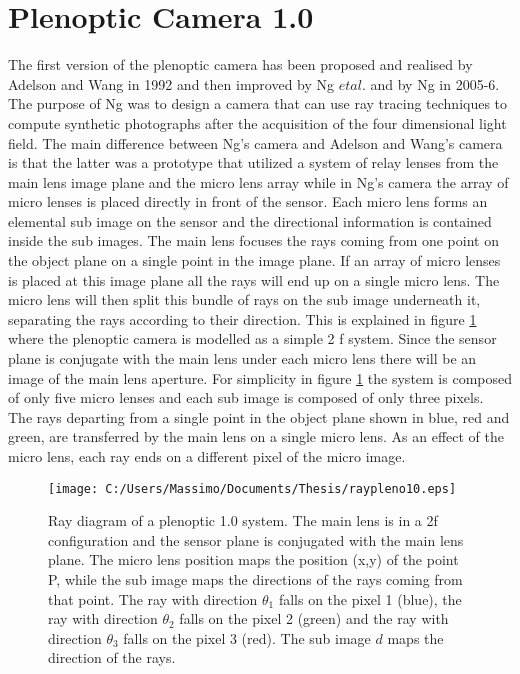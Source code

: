 \section{Plenoptic Camera 1.0}
\label{sec:camera10}
The first version of the plenoptic camera has been proposed and realised by Adelson and Wang in 1992 \cite{adelson1992single} and then improved by Ng $et al.$ \cite{ng2005light} and by Ng \cite{ng2006digital}in 2005-6.\\ The purpose of Ng was to design a camera that can use ray tracing techniques to compute synthetic photographs after the acquisition of the four dimensional light field. The main difference between Ng's camera and Adelson and Wang's camera is that the latter was a prototype that utilized a system of relay lenses from the main lens image plane and the micro lens array \cite{ng2005light} while in Ng's camera the array of micro lenses is placed directly in front of the sensor. Each micro lens forms an elemental sub image on the sensor and the directional information is contained inside the sub images. The main lens focuses the rays coming from one point on the object plane on a single point in the image plane. If an array of micro lenses is placed at this image plane all the rays will end up on a single micro lens. The micro lens will then split this bundle of rays on the sub image underneath it, separating the rays according to their direction. This is explained in figure \ref{fig:plenoptic3} where the plenoptic camera is modelled as a simple 2 f system. Since the sensor plane is conjugate with the main lens under each micro lens there will be an image of the main lens aperture. For simplicity in figure \ref{fig:plenoptic3} the system is composed of only five micro lenses and each sub image is composed of only three pixels. The rays departing from a single point in the object plane shown in blue, red and green, are transferred by the main lens on a single micro lens. As an effect of the micro lens, each ray ends on a different pixel of the micro image.
\begin{figure}[H]
\centering
\texttt{[image: C:/Users/Massimo/Documents/Thesis/raypleno10.eps]}
\caption{\label{fig:plenoptic3}Ray diagram of a plenoptic 1.0 system. The main lens is in a 2f configuration and the sensor plane is conjugated with the main lens plane. The micro lens position maps the position (x,y) of the point P, while the sub image maps the directions of the rays coming from that point. The ray with direction $\theta_1$ falls on the pixel 1 (blue), the ray with direction $\theta_2$ falls on the pixel 2 (green) and the ray with direction $\theta_3$ falls on the pixel 3 (red). The sub image $d$ maps the direction of the rays.  }
\end{figure}
